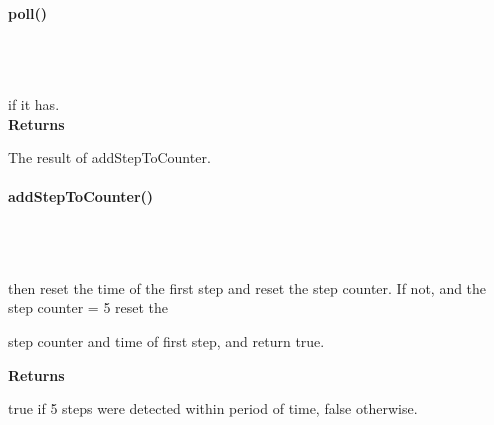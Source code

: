         \paragraph{poll()}\mbox{}\\

            \\

            
            if it has.\\

            \textbf{Returns}

                \quad \quad The result of addStepToCounter.\\


        \paragraph{addStepToCounter()}\mbox{}\\

            \\


            then reset the time of the first step and reset the step counter. If not, and the step counter = 5 reset the 

            step counter and time of first step, and return true.

            \textbf{Returns}

                \quad \quad true if 5 steps were detected within period of time, false otherwise.\\